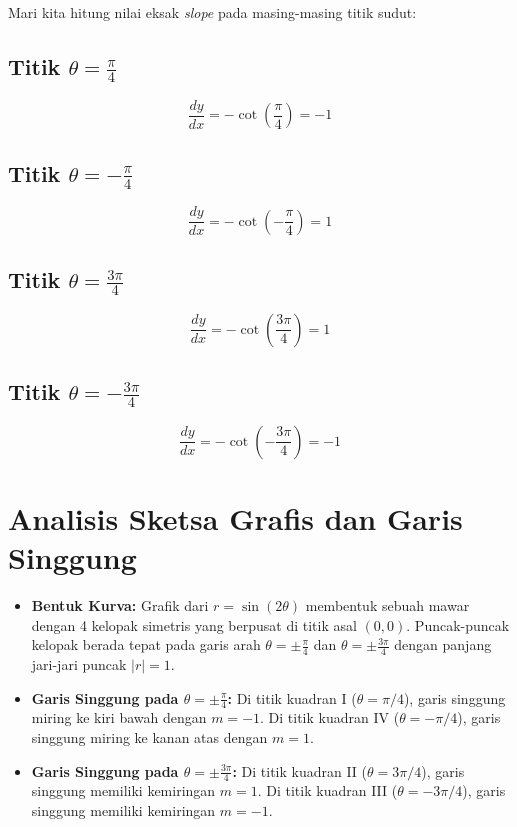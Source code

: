 \documentclass[11pt,a4paper]{article}
\begin{document}
Mari kita hitung nilai eksak \textit{slope} pada masing-masing titik sudut:

\subsection{Titik $\theta = \frac{\pi}{4}$}
\begin{equation*}
  \frac{dy}{dx} = -\cot\left(\frac{\pi}{4}\right) = -1
\end{equation*}

\subsection{Titik $\theta = -\frac{\pi}{4}$}
\begin{equation*}
  \frac{dy}{dx} = -\cot\left(-\frac{\pi}{4}\right) = 1
\end{equation*}

\subsection{Titik $\theta = \frac{3\pi}{4}$}
\begin{equation*}
  \frac{dy}{dx} = -\cot\left(\frac{3\pi}{4}\right) = 1
\end{equation*}

\subsection{Titik $\theta = -\frac{3\pi}{4}$}
\begin{equation*}
  \frac{dy}{dx} = -\cot\left(-\frac{3\pi}{4}\right) = -1
\end{equation*}

\section{Analisis Sketsa Grafis dan Garis Singgung}
\begin{itemize}
  \item \textbf{Bentuk Kurva:} Grafik dari $r = \sin(2\theta)$ membentuk sebuah mawar dengan 4 kelopak simetris yang berpusat di titik asal $(0,0)$. Puncak-puncak kelopak berada tepat pada garis arah $\theta = \pm\frac{\pi}{4}$ dan $\theta = \pm\frac{3\pi}{4}$ dengan panjang jari-jari puncak $|r| = 1$.
  \item \textbf{Garis Singgung pada $\theta = \pm\frac{\pi}{4}$:} Di titik kuadran I ($\theta = \pi/4$), garis singgung miring ke kiri bawah dengan $m = -1$. Di titik kuadran IV ($\theta = -\pi/4$), garis singgung miring ke kanan atas dengan $m = 1$.
  \item \textbf{Garis Singgung pada $\theta = \pm\frac{3\pi}{4}$:} Di titik kuadran II ($\theta = 3\pi/4$), garis singgung memiliki kemiringan $m = 1$. Di titik kuadran III ($\theta = -3\pi/4$), garis singgung memiliki kemiringan $m = -1$.
\end{itemize}
\end{document}
